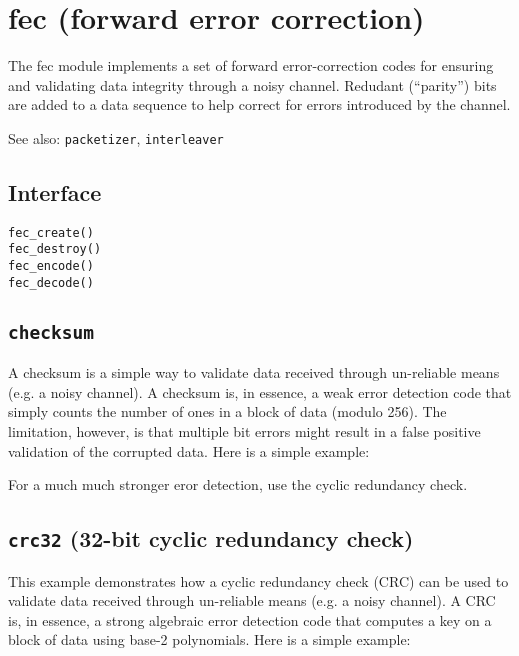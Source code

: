 % 
%

\section{fec (forward error correction)}
\label{module:fec}
The fec module implements a set of forward error-correction codes for
ensuring and validating data integrity through a noisy channel.
Redudant (``parity'') bits are added to a data sequence to help correct for
errors introduced by the channel.

See also: {\tt packetizer}, {\tt interleaver}

\subsection{Interface}
\label{module:fec:interface}

\begin{description}
\item[{\tt fec\_create()}]
\item[{\tt fec\_destroy()}]
\item[{\tt fec\_encode()}]
\item[{\tt fec\_decode()}]
\end{description}


\subsection{{\tt checksum}}
\label{module:fec:checksum}
A checksum is a simple way to validate data received through un-reliable means
(e.g. a noisy channel).
A checksum is, in essence, a weak error detection code that simply counts the
number of ones in a block of data (modulo 256).
The limitation, however, is that multiple bit errors might result in a false
positive validation of the corrupted data.
Here is a simple example:
%

%
For a much much stronger eror detection, use the cyclic redundancy check.

\subsection{{\tt crc32} (32-bit cyclic redundancy check)}
\label{module:fec:crc32}
This example demonstrates how a cyclic redundancy check (CRC) can be used to
validate data received through un-reliable means (e.g. a noisy channel).
A CRC is, in essence, a strong algebraic error detection code that computes a
key on a block of data using base-2 polynomials.
Here is a simple example:
%


